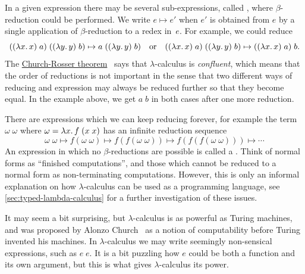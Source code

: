 In a given expression there may be several sub-expressions, called
, where $\beta$-reduction could be performed. We write
$e \mapsto e'$ when $e'$ is obtained from $e$ by a single application
of $\beta$-reduction to a redex in~$e$. For example, we could reduce
%
\begin{equation*}
  ((\lambda x .\,x)\; a)\;((\lambda y .\,y)\;b) \mapsto
  a\; ((\lambda y .\,y)\;b)
  \quad\text{or}\quad
  ((\lambda x .\,x)\; a)\;((\lambda y .\,y)\;b) \mapsto
  ((\lambda x .\,x)\; a)\; b.
\end{equation*}
%
The \href{http://en.wikipedia.org/wiki/Church%E2%80%93Rosser_theorem}{Church-Rosser theorem}~\sidecite{church36:_some_proper_of_conver} says that
$\lambda$-calculus is \emph{confluent}, which means that the order of
reductions is not important in the sense that two different ways of
reducing and expression may always be reduced further so that they
become equal. In the example above, we get $a\;b$ in both cases after
one more reduction.

There are expressions which we can keep reducing forever, for example
the term $\omega\;\omega$ where $\omega = \lambda x .\,f\;(x\;x)$ has an
infinite reduction sequence
%
\begin{equation*}
  \omega\; \omega \mapsto
  f(\omega\; \omega) \mapsto 
  f(f(\omega\; \omega)) \mapsto 
  f(f(f(\omega\; \omega))) \mapsto
  \cdots
\end{equation*}
%
An expression in which no $\beta$-reductions are possible is called a
. Think of normal forms as ``finished
computations'', and those which cannot be reduced to a normal form as
non-terminating computations. However, this is only an informal
explanation on how $\lambda$-calculus can be used as a programming
language, see \cref{sec:typed-lambda-calculus} for a
further investigation of these issues.

It may seem a bit surprising, but $\lambda$-calculus is as powerful as
Turing machines, and was proposed by Alonzo Church~ as a
notion of computability before Turing invented his machines. In
$\lambda$-calculus we may write seemingly non-sensical expressions,
such as $e\; e$. It is a bit puzzling how $e$ could be both a function
and its own argument, but this is what gives $\lambda$-calculus its
power.

